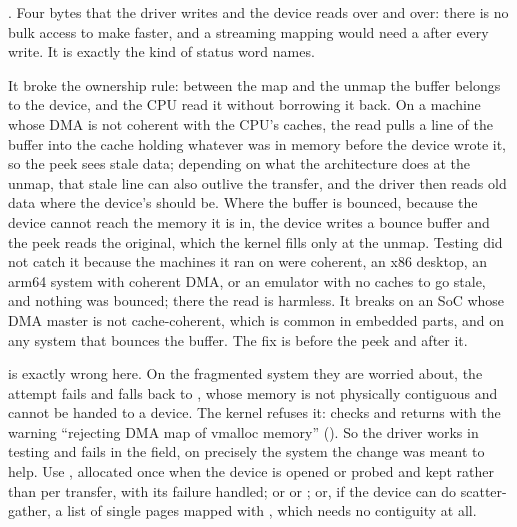  . Four bytes that the driver writes and the device reads over
and over: there is no bulk access to make faster, and a streaming mapping would need a
 after every write. It is exactly the kind of status word
 names.

 It broke the ownership rule: between the map and the unmap the buffer belongs to the
device, and the CPU read it without borrowing it back. On a machine whose DMA is not coherent with
the CPU's caches, the read pulls a line of the buffer into the cache holding whatever was in memory
before the device wrote it, so the peek sees stale data; depending on what the architecture does at
the unmap, that stale line can also outlive the transfer, and the driver then reads old data where
the device's should be. Where the buffer is bounced, because the device cannot reach the memory it
is in, the device writes a bounce buffer and the peek reads the original, which the kernel fills
only at the unmap. Testing did not catch it because the machines it ran on were coherent, an x86
desktop, an arm64 system with coherent DMA, or an emulator with no caches to go stale, and nothing
was bounced; there the read is harmless. It breaks on an SoC whose DMA master is not cache-coherent,
which is common in embedded parts, and on any system that bounces the buffer. The fix is
 before the peek and  after it.

  is exactly wrong here. On the fragmented system they are worried about,
the  attempt fails and  falls back to , whose memory is
not physically contiguous and cannot be handed to a device. The kernel refuses it:
 checks  and returns 
with the warning ``rejecting DMA map of vmalloc memory'' (). So
the driver works in testing and fails in the field, on precisely the system the change was meant to
help. Use , allocated once when the device is opened or probed and kept rather than
per transfer, with its failure handled; or  or ; or, if
the device can do scatter-gather, a list of single pages mapped with , which needs
no contiguity at all.


